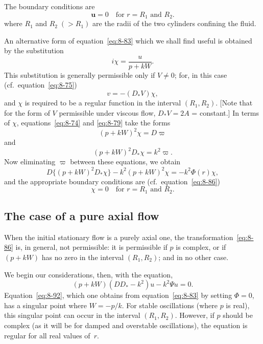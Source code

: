 The boundary conditions are
\begin{equation}
\label{eq:8-85}
\mathbf{u} = 0 \quad \text{for } r = R_1 \text{ and } R_2.
\end{equation}
where $R_1$ and $R_2\;(> R_1)$ are the radii of the two cylinders confining the fluid.

An alternative form of equation~\eqref{eq:8-83} which we shall find useful is obtained by the substitution
\begin{equation}
\label{eq:8-86}
i\chi = \frac{u}{p+kW}.
\end{equation}
This substitution is generally permissible only if $V \neq 0$; for, in this case (cf.\ equation~\eqref{eq:8-75})
\begin{equation}
\label{eq:8-87}
v = -(D_*V)\chi,
\end{equation}
and $\chi$ is required to be a regular function in the interval $(R_1, R_2)$. [Note that for the form of $V$ permissible under viscous flow, $D_*V = 2A$ = constant.] In terms of $\chi$, equations~\eqref{eq:8-74} and \eqref{eq:8-79} take the forms
\begin{equation}
\label{eq:8-88}
(p+kW)^2\chi = D\varpi
\end{equation}
and
\begin{equation}
\label{eq:8-89}
(p+kW)^2 D_*\chi = k^2\varpi.
\end{equation}
Now eliminating $\varpi$ between these equations, we obtain
\begin{equation}
\label{eq:8-90}
D\bigl\{(p+kW)^2 D_*\chi\bigr\} - k^2(p+kW)^2\chi = -k^2\Phi(r)\chi,
\end{equation}
and the appropriate boundary conditions are (cf.\ equation~\eqref{eq:8-86})
\begin{equation}
\label{eq:8-91}
\chi = 0 \quad \text{for } r = R_1 \text{ and } R_2.
\end{equation}

\subsection{The case of a pure axial flow}
\label{sec:78a}

When the initial stationary flow is a purely axial one, the transformation~\eqref{eq:8-86} is, in general, not permissible: it is permissible if $p$ is complex, or if $(p+kW)$ has no zero in the interval $(R_1,R_2)$; and in no other case.

We begin our considerations, then, with the equation,
\begin{equation}
\label{eq:8-92}
(p+kW)(DD_*-k^2)u - k^2\Psi u = 0.
\end{equation}
Equation~\eqref{eq:8-92}, which one obtains from equation~\eqref{eq:8-83} by setting $\Phi = 0$, has a singular point where $W = -p/k$. For stable oscillations (where $p$ is real), this singular point can occur in the interval $(R_1, R_2)$. However, if $p$ should be complex (as it will be for damped and overstable oscillations), the equation is regular for all real values of~$r$.

